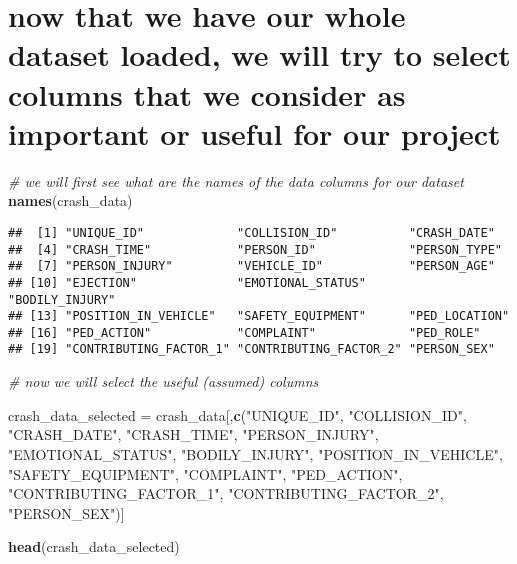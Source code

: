 \documentclass[
]{article}
\newenvironment{Shaded}{\begin{snugshade}}{\end{snugshade}}
\newcommand{\CommentTok}[1]{\textcolor[rgb]{0.56,0.35,0.01}{\textit{#1}}}
\newcommand{\FunctionTok}[1]{\textcolor[rgb]{0.13,0.29,0.53}{\textbf{#1}}}
\newcommand{\NormalTok}[1]{#1}
\newcommand{\OtherTok}[1]{\textcolor[rgb]{0.56,0.35,0.01}{#1}}
\newcommand{\StringTok}[1]{\textcolor[rgb]{0.31,0.60,0.02}{#1}}
\begin{document}
\hypertarget{now-that-we-have-our-whole-dataset-loaded-we-will-try-to-select-columns-that-we-consider-as-important-or-useful-for-our-project}{%
\section{now that we have our whole dataset loaded, we will try to
select columns that we consider as important or useful for our
project}\label{now-that-we-have-our-whole-dataset-loaded-we-will-try-to-select-columns-that-we-consider-as-important-or-useful-for-our-project}}

\begin{Shaded}
\begin{Highlighting}[]
\CommentTok{\# we will first see what are the names of the data columns for our dataset}
\FunctionTok{names}\NormalTok{(crash\_data)}
\end{Highlighting}
\end{Shaded}

\begin{verbatim}
##  [1] "UNIQUE_ID"             "COLLISION_ID"          "CRASH_DATE"           
##  [4] "CRASH_TIME"            "PERSON_ID"             "PERSON_TYPE"          
##  [7] "PERSON_INJURY"         "VEHICLE_ID"            "PERSON_AGE"           
## [10] "EJECTION"              "EMOTIONAL_STATUS"      "BODILY_INJURY"        
## [13] "POSITION_IN_VEHICLE"   "SAFETY_EQUIPMENT"      "PED_LOCATION"         
## [16] "PED_ACTION"            "COMPLAINT"             "PED_ROLE"             
## [19] "CONTRIBUTING_FACTOR_1" "CONTRIBUTING_FACTOR_2" "PERSON_SEX"
\end{verbatim}

\begin{Shaded}
\begin{Highlighting}[]
\CommentTok{\# now we will select the useful (assumed) columns}

\NormalTok{crash\_data\_selected }\OtherTok{=}\NormalTok{ crash\_data[,}\FunctionTok{c}\NormalTok{(}\StringTok{"UNIQUE\_ID"}\NormalTok{, }\StringTok{"COLLISION\_ID"}\NormalTok{, }\StringTok{"CRASH\_DATE"}\NormalTok{, }\StringTok{"CRASH\_TIME"}\NormalTok{, }\StringTok{"PERSON\_INJURY"}\NormalTok{, }\StringTok{"EMOTIONAL\_STATUS"}\NormalTok{, }\StringTok{"BODILY\_INJURY"}\NormalTok{, }\StringTok{"POSITION\_IN\_VEHICLE"}\NormalTok{, }\StringTok{"SAFETY\_EQUIPMENT"}\NormalTok{, }\StringTok{"COMPLAINT"}\NormalTok{, }\StringTok{"PED\_ACTION"}\NormalTok{, }\StringTok{"CONTRIBUTING\_FACTOR\_1"}\NormalTok{, }\StringTok{"CONTRIBUTING\_FACTOR\_2"}\NormalTok{, }\StringTok{"PERSON\_SEX"}\NormalTok{)]}

\FunctionTok{head}\NormalTok{(crash\_data\_selected)}
\end{Highlighting}
\end{Shaded}
\end{document}
